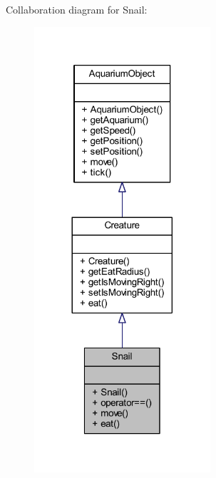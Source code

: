 Collaboration diagram for Snail\+:\nopagebreak
\begin{figure}[H]
\begin{center}
\leavevmode
\includegraphics[width=185pt]{class_snail__coll__graph}
\end{center}
\end{figure}
